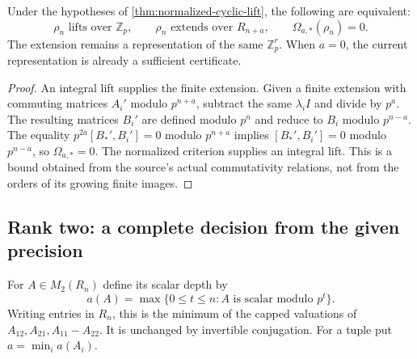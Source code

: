 \begin{corollary}\label{cor:abelian-cyclic-horizon}
Under the hypotheses of \cref{thm:normalized-cyclic-lift}, the following are equivalent:
\[
 \rho_n\text{ lifts over }\mathbb Z_p,
 \qquad \rho_n\text{ extends over }R_{n+a},
 \qquad \Omega_{a,*}(\rho_n)=0.
\]
The extension remains a representation of the same $\mathbb Z_p^r$. When $a=0$, the current representation is already a sufficient certificate.
\end{corollary}
\begin{proof}
An integral lift supplies the finite extension. Given a finite extension with commuting matrices $A_i'$ modulo $p^{n+a}$, subtract the same $\lambda_iI$ and divide by $p^a$. The resulting matrices $B_i'$ are defined modulo $p^n$ and reduce to $B_i$ modulo $p^{n-a}$. The equality
$p^{2a}[B_*',B_i']=0$ modulo $p^{n+a}$ implies
$[B_*',B_i']=0$ modulo $p^{n-a}$, so $\Omega_{a,*}=0$. The normalized criterion supplies an integral lift. This is a bound obtained from the source's actual commutativity relations, not from the orders of its growing finite images.
\end{proof}

\subsection{Rank two: a complete decision from the given precision}

For $A\in M_2(R_n)$ define its scalar depth by
\[
 a(A)=\max\{0\leq t\leq n:A\text{ is scalar modulo }p^t\}.
\]
Writing entries in $R_n$, this is the minimum of the capped valuations of
$A_{12},A_{21},A_{11}-A_{22}$. It is unchanged by invertible conjugation. For a tuple put $a=\min_i a(A_i)$.

